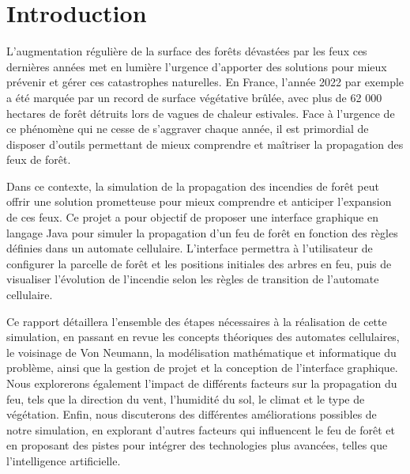\setcounter{page}{1}
{}
\section*{Introduction}

L'augmentation régulière de la surface des forêts dévastées par les feux ces dernières années met en lumière l'urgence d'apporter des solutions pour mieux prévenir et gérer ces catastrophes naturelles. En France, l'année 2022 par exemple a été marquée par un record de surface végétative brûlée, avec plus de 62 000 hectares de forêt détruits lors de vagues de chaleur estivales. Face à l'urgence de ce phénomène qui ne cesse de s'aggraver chaque année, il est primordial de disposer d'outils permettant de mieux comprendre et maîtriser la propagation des feux de forêt. 

Dans ce contexte, la simulation de la propagation des incendies de forêt peut offrir une solution prometteuse pour mieux comprendre et anticiper l'expansion de ces feux. Ce projet a pour objectif de proposer une interface graphique en langage Java pour simuler la propagation d'un feu de forêt en fonction des règles définies dans un automate cellulaire. L'interface permettra à l'utilisateur de configurer la parcelle de forêt et les positions initiales des arbres en feu, puis de visualiser l'évolution de l'incendie selon les règles de transition de l'automate cellulaire.  

Ce rapport détaillera l'ensemble des étapes nécessaires à la réalisation de cette simulation, en passant en revue les concepts théoriques des automates cellulaires, le voisinage de Von Neumann, la modélisation mathématique et informatique du problème, ainsi que la gestion de projet et la conception de l'interface graphique. Nous explorerons également l'impact de différents facteurs sur la propagation du feu, tels que la direction du vent, l'humidité du sol, le climat et le type de végétation. Enfin, nous discuterons des différentes améliorations possibles de notre simulation, en explorant d’autres facteurs qui influencent le feu de forêt et en proposant des pistes pour intégrer des technologies plus avancées, telles que l'intelligence artificielle.